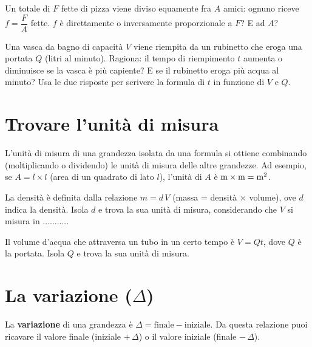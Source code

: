 \documentclass[11pt]{report}
\begin{document}
\begin{exercise}[\onestar]
Un totale di $F$ fette di pizza viene diviso equamente fra $A$ amici: ognuno riceve $f=\dfrac FA$ fette. $f$ è direttamente o inversamente proporzionale a $F$? E ad $A$?
\end{exercise}

\begin{exercise}[\onestar]
Una vasca da bagno di capacità $V$ viene riempita da un rubinetto che eroga una portata $Q$ (litri al minuto). Ragiona: il tempo di riempimento $t$ aumenta o diminuisce se la vasca è più capiente? E se il rubinetto eroga più acqua al minuto? Usa le due risposte per scrivere la formula di $t$ in funzione di $V$ e $Q$.
\end{exercise}

\section{Trovare l'unità di misura}

\begin{mdframed}
L'unità di misura di una grandezza isolata da una formula si ottiene combinando (moltiplicando o dividendo) le unità di misura delle altre grandezze. Ad esempio, se $A=l\times l$ (area di un quadrato di lato $l$), l'unità di $A$ è $\text m\times\text m=\text m^2$.
\end{mdframed}

\begin{exercise}[\onestar]
La densità è definita dalla relazione $m=d\, V$ (massa = densità $\times$ volume), ove $d$ indica la densità. Isola $d$ e trova la sua unità di misura, considerando che $V$ si misura in ...........
\end{exercise}

\begin{exercise}[\onestar]
Il volume d'acqua che attraversa un tubo in un certo tempo è $V=Qt$, dove $Q$ è la portata. Isola $Q$ e trova la sua unità di misura.
\end{exercise}

\section{La variazione (\texorpdfstring{$\Delta$}{Delta})}

\begin{mdframed}
La \textbf{variazione} di una grandezza è $\Delta = \text{finale} - \text{iniziale}$. Da questa relazione puoi ricavare il valore finale (iniziale $+\, \Delta$) o il valore iniziale (finale $-\, \Delta$).
\end{mdframed}
\end{document}
